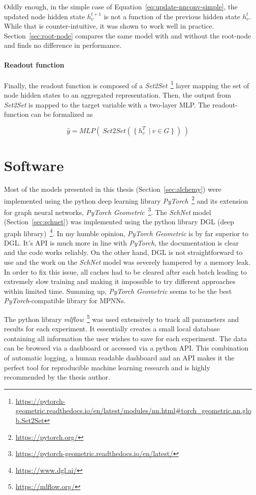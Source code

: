 Oddly enough, in the simple case of Equation~\ref{eq:update-nnconv-simple}, the updated node hidden state $h_v^{t+1}$ is not a function of the previous hidden state $h_v^t$. While that is counter-intuitive, it was shown to work well in practice. Section~\ref{sec:root-node} compares the same model with and without the root-node and finds no difference in performance.

\paragraph{Readout function} Finally, the readout function is composed of a \textit{Set2Set}~\footnote{\url{https://pytorch-geometric.readthedocs.io/en/latest/modules/nn.html\#torch_geometric.nn.glob.Set2Set}} layer mapping the set of node hidden states to an aggregated representation. Then, the output from \textit{Set2Set} is mapped to the target variable with a two-layer MLP. The readout-function can be formalized as

\begin{equation}
		\hat{y} = MLP(~Set2Set(~\{~h_v^T\ ~|~ v \in G~\}~)~)
\end{equation}

\section{Software}

Most of the models presented in this thesis (Section~\ref{sec:alchemy}) were implemented using the python deep learning library \textit{PyTorch}~\footnote{\url{https://pytorch.org/}} and its extension for graph neural networks, \textit{PyTorch Geometric}~\footnote{\url{https://pytorch-geometric.readthedocs.io/en/latest/}}. The \textit{SchNet} model (Section~\ref{sec:schnet}) was implemented using the python library DGL (deep graph library)~\footnote{\url{https://www.dgl.ai/}}. In my humble opinion, \textit{PyTorch Geometric} is by far superior to DGL. It's API is much more in line with \textit{PyTorch}, the documentation is clear and the code works reliably. On the other hand, DGL is not straightforward to use and the work on the \textit{SchNet} model was severely hampered by a memory leak. In order to fix this issue, all caches had to be cleared after each batch leading to extremely slow training and making it impossible to try different approaches within limited time. Summing up, \textit{PyTorch Geometric} seems to be the best \textit{PyTorch}-compatible library for MPNNs.

The python library \textit{mlflow}~\footnote{\url{https://mlflow.org/}} was used extensively to track all parameters and results for each experiment. It essentially creates a small local database containing all information the user wishes to save for each experiment. The data can be browsed via a dashboard or accessed via a python API. This combination of automatic logging, a human readable dashboard and an API makes it the perfect tool for reproducible machine learning research and is highly recommended by the thesis author.

